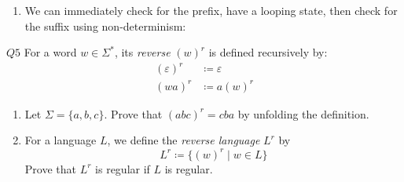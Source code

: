 \documentclass{article}
\theoremstyle{definition}
\theoremstyle{definition}
\theoremstyle{remark}
\begin{document}
\begin{enumerate}
    \item[$(ii)$] We can immediately check for the prefix, have a looping state, then check for the suffix using non-determinism:
    \begin{center}
    \end{center}
\end{enumerate}










\begin{questionbox}{$Q5$}
    For a word $w\in\Sigma^\ast$, its \textit{reverse} $(w)^r$ is defined recursively by:
    \begin{align*}
        (\varepsilon)^r&\coloneqq\varepsilon\\
        (wa)^r&\coloneqq a(w)^r
    \end{align*}
    \begin{enumerate}
        \item[$(i)$] Let $\Sigma=\{a,b,c\}$. Prove that $(abc)^r=cba$ by unfolding the definition.
        
        \item[$(ii)$] For a language $L$, we define the \textit{reverse language} $L^r$ by
        \begin{equation*}
            L^r\coloneqq\bigl\{(w)^r\mid w\in L\bigr\}
        \end{equation*}
        Prove that $L^r$ is regular if $L$ is regular.
    \end{enumerate}
\end{questionbox}

\bigskip
\end{document}
